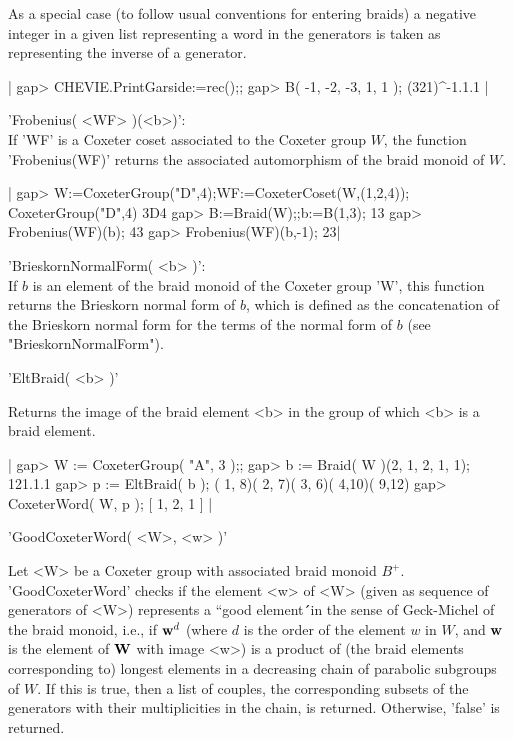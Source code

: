 As  a  special  case  (to  follow  usual conventions for entering braids) a
negative  integer in a given list representing  a word in the generators is
taken as representing the inverse of a generator.

|    gap> CHEVIE.PrintGarside:=rec();;
    gap> B( -1, -2, -3, 1, 1 );
    (321)^-1.1.1 |


'Frobenius(  <WF> )(<b>)':\\ If  'WF' is a  Coxeter coset associated to the
Coxeter  group  $W$,  the  function  'Frobenius(WF)' returns the associated
automorphism of the braid monoid of $W$.

|    gap> W:=CoxeterGroup("D",4);WF:=CoxeterCoset(W,(1,2,4));
    CoxeterGroup("D",4)
    3D4
    gap> B:=Braid(W);;b:=B(1,3);
    13
    gap> Frobenius(WF)(b);
    43
    gap> Frobenius(WF)(b,-1);
    23|

'BrieskornNormalForm( <b> )':\\ If $b$ is an element of the braid monoid of
the  Coxeter group 'W', this function  returns the Brieskorn normal form of
$b$, which is defined as the concatenation of the Brieskorn normal form for
the terms of the normal form of $b$ (see "BrieskornNormalForm").


'EltBraid( <b> )'

Returns  the image of the braid element <b>  in the group of which <b> is a
braid element.

|    gap>  W := CoxeterGroup( "A", 3 );;
    gap>  b := Braid( W )(2, 1, 2, 1, 1);
    121.1.1
    gap> p := EltBraid( b );
    ( 1, 8)( 2, 7)( 3, 6)( 4,10)( 9,12)
    gap> CoxeterWord( W, p );
    [ 1, 2, 1 ] |


'GoodCoxeterWord( <W>, <w> )'

Let   <W>  be  a   Coxeter  group  with   associated  braid  monoid  $B^+$.
'GoodCoxeterWord'  checks if the  element <w> of  <W> (given as sequence of
generators  of  <W>)  represents  a  ``good  element\'\'\  in  the sense of
Geck-Michel \cite{GM97} of the braid monoid, i.e., if ${\bf w}^d$ (where $d$ is
the order of the element $w$ in $W$, and ${\bf w}$ is the element of ${\bf W}$ with
image  <w>) is a  product of (the  braid elements corresponding to) longest
elements  in a decreasing chain  of parabolic subgroups of  $W$. If this is
true,  then a list of couples,  the corresponding subsets of the generators
with  their multiplicities in the chain, is returned. Otherwise, 'false' is
returned.

